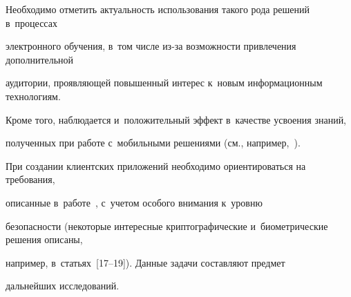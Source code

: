 Необходимо отметить актуальность использования такого рода решений в~процессах 


электронного обучения, в~том числе из-за возможности привлечения дополнительной 


аудитории, про\-яв\-ля\-ющей повышенный интерес к~новым информационным технологиям. 


Кроме того, наблюдается и~положительный эффект в~качестве усвоения знаний, 


полученных при работе с~мобильными решениями (см., например,~\cite{Chen2010-2}). 


При создании клиентских приложений необходимо ориентироваться на требования, 


описанные в~работе~\cite{Gorshenin2016c-2}, с~учетом особого внимания к~уровню 


безопасности (некоторые интересные криптографические и~биометрические решения описаны, 


например, в~статьях~[17--19]). Данные задачи составляют предмет 


дальнейших исследований.











